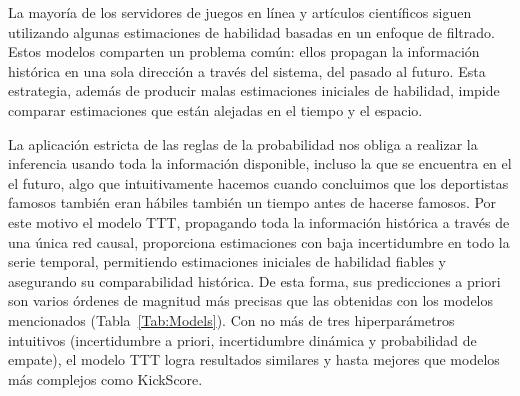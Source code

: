 \documentclass[a4paper,11pt]{book}
\theoremstyle{definition}
\begin{document}
La mayor\'ia de los servidores de juegos en l\'inea y art\'iculos cient\'ificos siguen utilizando algunas estimaciones de habilidad basadas en un enfoque de filtrado.
%
%
%
%
Estos modelos comparten un problema com\'un: ellos propagan la informaci\'on hist\'orica en una sola direcci\'on a trav\'es del sistema, del pasado al futuro.
%
Esta estrategia, adem\'as de producir malas estimaciones iniciales de habilidad, impide comparar estimaciones que est\'an alejadas en el tiempo y el espacio.

La aplicaci\'on estricta de las reglas de la probabilidad nos obliga a realizar la inferencia usando toda la informaci\'on disponible, incluso la que se encuentra en el el futuro, algo que intuitivamente hacemos cuando concluimos que los deportistas famosos tambi\'en eran h\'abiles tambi\'en un tiempo antes de hacerse famosos.
%
Por este motivo el modelo TTT, propagando toda la informaci\'on hist\'orica a trav\'es de una \'unica red causal, proporciona estimaciones con baja incertidumbre en todo la serie temporal, permitiendo estimaciones iniciales de habilidad fiables y asegurando su comparabilidad hist\'orica.
%
De esta forma, sus predicciones a priori son varios \'ordenes de magnitud m\'as precisas que las obtenidas con los modelos mencionados (Tabla~\ref{Tab:Models}).
%
Con no m\'as de tres hiperpar\'ametros intuitivos (incertidumbre a priori, incertidumbre din\'amica y probabilidad de empate), el modelo TTT logra resultados similares y hasta mejores que modelos m\'as complejos como KickScore.
\end{document}
